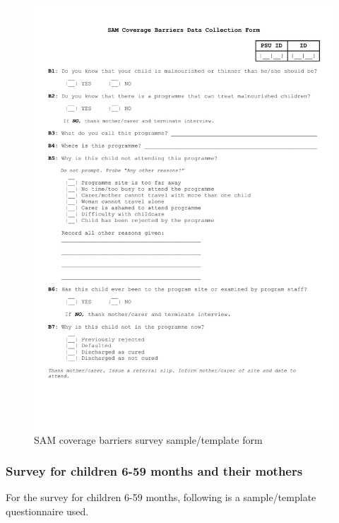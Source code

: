 \documentclass[12pt,a4paper]{article}
\begin{document}
\begin{figure}[H]

{\centering \includegraphics[width=0.9\linewidth]{forms/samBarriersForm} 

}

\caption{SAM coverage barriers survey sample/template form}\label{fig:sambarriers}
\end{figure}

\newpage

\hypertarget{survey-for-children-6-59-months-and-their-mothers}{%
\subsubsection{Survey for children 6-59 months and their mothers}\label{survey-for-children-6-59-months-and-their-mothers}}

For the survey for children 6-59 months, following is a sample/template questionnaire used.
\end{document}
